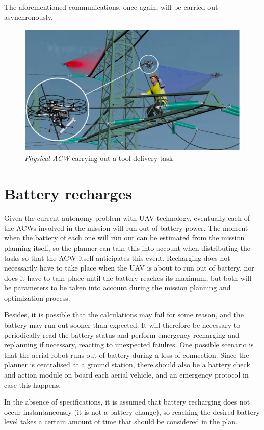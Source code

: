 The aforementioned communications, once again, will be carried out asynchronously. 


\begin{figure}[htbp]
    \centering
    \includegraphics[width=0.7\linewidth]
    {ProblemFormulation/figures/deliver_task.png}
    \caption{\textit{Physical-ACW} carrying out a tool delivery task}
    \label{fig:deliver_task}
\end{figure}

\section{Battery recharges}
\label{sec:BatteryRecharges}
Given the current autonomy problem with \gls{UAV} technology, eventually each of the \glspl{ACW} involved in the mission will run out of battery power. The moment when the battery of each one will run out can be estimated from the mission planning itself, so the planner can take this into account when distributing the tasks so that the \gls{ACW} itself anticipates this event. Recharging does not necessarily have to take place when the \gls{UAV} is about to run out of battery, nor does it have to take place until the battery reaches its maximum, but both will be parameters to be taken into account during the mission planning and optimization process.

Besides, it is possible that the calculations may fail for some reason, and the battery may run out sooner than expected. It will therefore be necessary to periodically read the battery status and perform emergency recharging and replanning if necessary, reacting to unexpected faiulres. One possible scenario is that the aerial robot runs out of battery during a loss of connection. Since the planner is centralised at a ground station, there should also be a battery check and action module on board each aerial vehicle, and an emergency protocol in case this happens.

In the absence of specifications, it is assumed that battery recharging does not occur instantaneously (it is not a battery change), so reaching the desired battery level takes a certain amount of time that should be considered in the plan.

